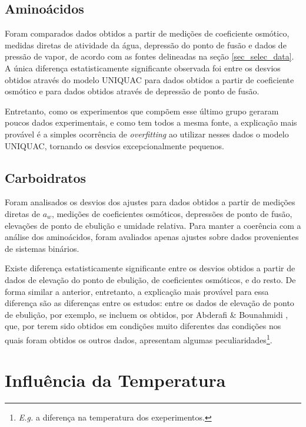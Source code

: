 \documentclass[
	12pt,				%
	openright,
	twoside,
	a4paper,			%
	english,			%
	french,				%
	spanish,			%
	brazil				%
	]{abntex2}
\begin{document}
\subsection{Aminoácidos}

Foram comparados dados obtidos a partir de medições de coeficiente osmótico,
medidas diretas de atividade da água, depressão do ponto de fusão e dados de
pressão de vapor, de acordo com as fontes delineadas na seção \ref{sec_selec_data}.
A única diferença estatisticamente significante observada foi entre os desvios
obtidos através do modelo UNIQUAC para dados obtidos a partir de coeficiente
osmótico e para dados obtidos através de depressão de ponto de fusão.

Entretanto, como os experimentos que compõem esse último grupo geraram poucos
dados experimentais, e como tem todos a mesma fonte, a explicação mais provável
é a simples ocorrência de \textit{overfitting} ao utilizar nesses dados o modelo
UNIQUAC, tornando os desvios excepcionalmente pequenos.

\subsection{Carboidratos}

Foram analisados os desvios dos ajustes para dados obtidos a partir de medições
diretas de $a_w$, medições de coeficientes osmóticos, depressões de ponto de fusão,
elevações de ponto de ebulição e umidade relativa. Para manter a coerência com a
análise dos aminoácidos, foram avaliados apenas ajustes sobre dados provenientes de
sistemas binários.

Existe diferença estatisticamente significante entre os desvios obtidos a partir
de dados de elevação do ponto de ebulição, de coeficientes osmóticos, e do resto.
De forma similar a anterior, entretanto, a explicação mais provável para essa
diferença são as diferenças entre os estudos: entre os dados de elevação de ponto
de ebulição, por exemplo, se incluem os obtidos, por Abderafi \& Bounahmidi
\cite{abderafi1994}, que, por terem sido obtidos em condições muito diferentes
das condições nos quais foram obtidos os outros dados, apresentam algumas
peculiaridades\footnote{%
	\textit{E.g.} a diferença na temperatura dos exeperimentos.
}.

\section{Influência da Temperatura}
\end{document}
